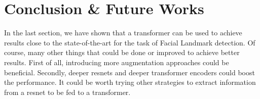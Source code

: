 \section{Conclusion \& Future Works}\label{sects:future}

In the last section, we have shown that a transformer can be used to achieve results close to the state-of-the-art for the task of Facial Landmark detection. Of course, many other things that could be done or improved to achieve better results. First of all, introducing more augmentation approaches could be beneficial. Secondly, deeper resnets and deeper transformer encoders could boost the performance. It could be worth trying other strategies to extract information from a resnet to be fed to a transformer.
